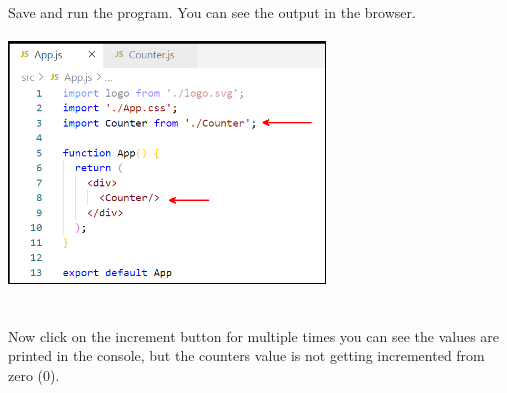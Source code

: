 \documentclass{article}
\begin{document}
\noindent 

\noindent \\
Save and run the program. You can see the output in the browser.

\begin{center}
	\noindent \includegraphics*[width=3.31in, height=2.63in]{IMG-09-35} 
\end{center}

\noindent 

\noindent 

\noindent \\
Now click on the increment button for multiple times you can see the values are printed in the console, but the counters value is not getting incremented from zero (0).

\noindent 
\end{document}
